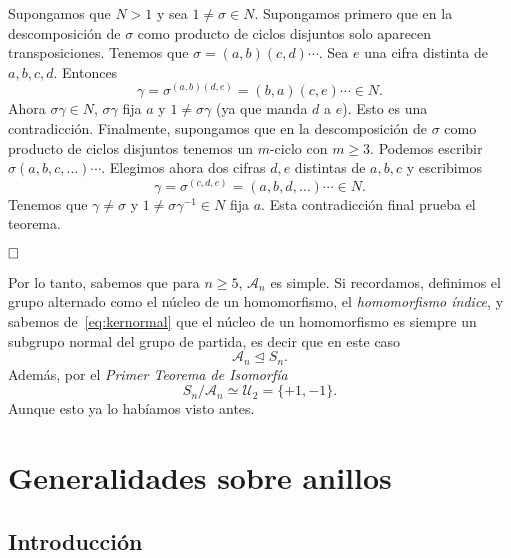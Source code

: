 \documentclass[12pt]{article}
\begin{document}
Supongamos que $N > 1$ y sea $1 \neq \sigma \in N$. Supongamos primero que en la descomposición de $\sigma$ como producto de ciclos disjuntos solo aparecen transposiciones. Tenemos que $\sigma = (a,b)(c,d) \cdots$. Sea $e$ una cifra distinta de $a,b,c,d$. Entonces $$\gamma = \sigma^{(a,b)(d,e)}=(b,a)(c,e) \cdots \in N.$$
Ahora $\sigma \gamma \in N$, $\sigma \gamma$ fija $a$ y $1 \neq \sigma \gamma$ (ya que manda $d$ a $e$). Esto es una contradicción. Finalmente, supongamos que en la descomposición de $\sigma$ como producto de ciclos disjuntos tenemos un $m$-ciclo con $m \geq 3$. Podemos escribir $\sigma (a,b,c, \ldots) \cdots$. Elegimos ahora dos cifras $d,e$ distintas de $a,b,c$ y escribimos $$\gamma = \sigma^{(c,d,e)} = (a,b,d, \ldots) \cdots \in N.$$ Tenemos que $\gamma \neq \sigma$ y $1 \neq \sigma \gamma^{-1} \in N$ fija $a$. Esta contradicción final prueba el teorema.

$\hfill \square$

Por lo tanto, sabemos que para $n \geq 5$, $\mathcal{A}_{n}$ es simple. Si recordamos, definimos el grupo alternado como el núcleo de un homomorfismo, el \textit{homomorfismo índice}, y sabemos de~\ref{eq:kernormal} que el núcleo de un homomorfismo es siempre un subgrupo normal del grupo de partida, es decir que en este caso $$\mathcal{A}_{n} \unlhd S_{n}.$$ Además, por el \textit{Primer Teorema de Isomorfía} $$S_{n}/\mathcal{A}_{n} \simeq \mathcal{U}_{2} = \lbrace +1, -1 \rbrace.$$ Aunque esto ya lo habíamos visto antes.

\section{Generalidades sobre anillos}
\subsection{Introducción}
\end{document}
